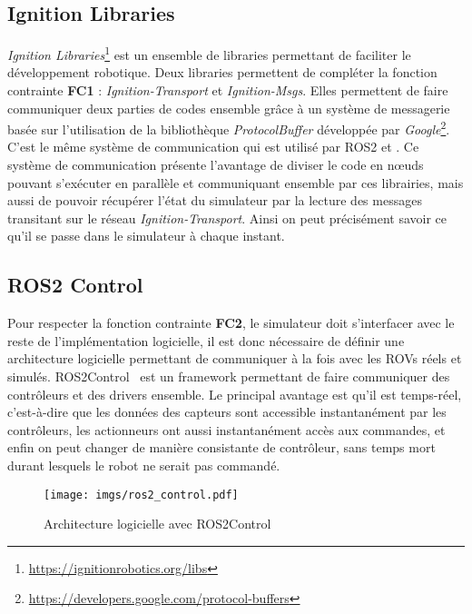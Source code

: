         \subsection{Ignition Libraries}

            \textit{Ignition Libraries}\footnote{\url{https://ignitionrobotics.org/libs}} est un ensemble de libraries permettant de faciliter le développement robotique. Deux libraries permettent de compléter la fonction contrainte \textbf{FC1} : \textit{Ignition-Transport} et \textit{Ignition-Msgs}. Elles permettent de faire communiquer deux parties de codes ensemble grâce à un système de messagerie basée sur l'utilisation de la bibliothèque \textit{ProtocolBuffer} développée par \textit{Google}\footnote{\url{https://developers.google.com/protocol-buffers}}. C'est le même système de communication qui est utilisé par \gls{ROS2} et \gazebo{}. Ce système de communication présente l'avantage de diviser le code en n\oe uds pouvant s'exécuter en parallèle et communiquant ensemble par ces librairies, mais aussi de pouvoir récupérer l'état du simulateur par la lecture des messages transitant sur le réseau \textit{Ignition-Transport}. Ainsi on peut précisément savoir ce qu'il se passe dans le simulateur à chaque instant.

        \subsection{ROS2 Control}

            Pour respecter la fonction contrainte \textbf{FC2}, le simulateur doit s'interfacer avec le reste de l'implémentation logicielle, il est donc nécessaire de définir une architecture logicielle permettant de communiquer à la fois avec les \gls{ROV}s réels et simulés. \gls{ROS2Control}~\cite{ros_control} est un framework permettant de faire communiquer des contrôleurs et des drivers ensemble. Le principal avantage est qu'il est temps-réel, c'est-à-dire que les données des capteurs sont accessible instantanément par les contrôleurs, les actionneurs ont aussi instantanément accès aux commandes, et enfin on peut changer de manière consistante de contrôleur, sans temps mort durant lesquels le robot ne serait pas commandé.

            \begin{figure}[!htb]
                \centering
                \texttt{[image: imgs/ros2\_control.pdf]}
                \caption{Architecture logicielle avec \gls{ROS2Control}}
                \label{fig:ros2_control}
            \end{figure}

